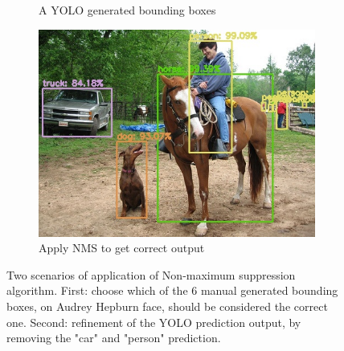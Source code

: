 \begin{figure}[!h]
\begin{subfigure}{.35\linewidth}
		\caption{A YOLO generated bounding boxes}
		\label{fig:sub_noNMS_yolo}
	\end{subfigure}
	\begin{subfigure}{.35\linewidth}
		\includegraphics[width=0.9\linewidth]{images/ex2_yolo}
		\caption{Apply NMS to get correct output}
		\label{fig:sub_withNMS_yolo}
	\end{subfigure}
	\caption{Two scenarios of application of Non-maximum suppression algorithm. First: choose which of the 6 manual generated bounding boxes, on Audrey Hepburn face, should be considered the correct one. Second: refinement of the YOLO prediction output, by removing the "car" and "person" prediction.}
	\label{fig:nms}
\end{figure}


